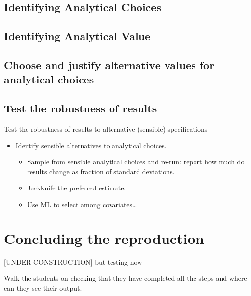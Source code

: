 \documentclass[]{book}
\providecommand{\tightlist}{%
  \setlength{\itemsep}{0pt}\setlength{\parskip}{0pt}}
\begin{document}
\hypertarget{id-analy}{%
\section{Identifying Analytical Choices}\label{id-analy}}

\hypertarget{id-val}{%
\section{Identifying Analytical Value}\label{id-val}}

\hypertarget{test-rob}{%
\section{Choose and justify alternative values for analytical choices}\label{test-rob}}

\hypertarget{test-the-robustness-of-results}{%
\section{Test the robustness of results}\label{test-the-robustness-of-results}}

Test the robustness of results to alternative (sensible) specifications

\begin{itemize}
\tightlist
\item
  Identify sensible alternatives to analytical choices.

  \begin{itemize}
  \tightlist
  \item
    Sample from sensible analytical choices and re-run: report how much do results change as fraction of standard deviations.\\
  \item
    Jackknife the preferred estimate.
  \item
    Use ML to select among covariates\ldots{}
  \end{itemize}
\end{itemize}

\hypertarget{concluding-the-reproduction}{%
\chapter{Concluding the reproduction}\label{concluding-the-reproduction}}

{[}UNDER CONSTRUCTION{]} but testing now

Walk the students on checking that they have completed all the steps and where can they see their output.
\end{document}
